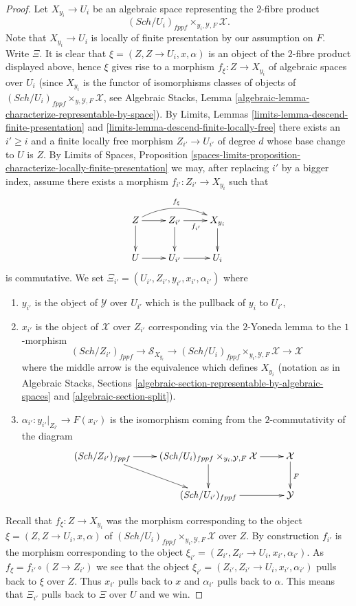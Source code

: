 \documentclass{stacks-project}
\theoremstyle{plain}
\theoremstyle{definition}
\theoremstyle{remark}
\numberwithin{equation}{subsection}
\def\Sch{\mathit{Sch}}
\begin{document}
\begin{proof}
\medskip\noindent
Let $X_{y_i} \to U_i$ be an algebraic space representing the $2$-fibre
product
$$
(\Sch/U_i)_{fppf} \times_{y_i, \mathcal{Y}, F} \mathcal{X}.
$$
Note that $X_{y_i} \to U_i$ is locally of finite presentation by our
assumption on $F$. Write $\Xi $. It is clear that
$\xi = (Z, Z \to U_i, x, \alpha)$ is an object of the $2$-fibre product
displayed above, hence $\xi$ gives rise to a morphism
$f_\xi : Z \to X_{y_i}$ of algebraic spaces over $U_i$
(since $X_{y_i}$ is the functor of isomorphisms classes of objects of
$(\Sch/U_i)_{fppf} \times_{y, \mathcal{Y}, F} \mathcal{X}$, see
Algebraic Stacks,
Lemma \ref{algebraic-lemma-characterize-representable-by-space}).
By
Limits, Lemmas \ref{limits-lemma-descend-finite-presentation} and
\ref{limits-lemma-descend-finite-locally-free}
there exists an $i' \geq i$ and a finite locally free morphism
$Z_{i'} \to U_{i'}$ of degree $d$ whose base change to $U$ is $Z$. By
Limits of Spaces, Proposition
\ref{spaces-limits-proposition-characterize-locally-finite-presentation}
we may, after replacing $i'$ by a bigger index, assume there exists a
morphism $f_{i'} : Z_{i'} \to X_{y_i}$ such that
$$
\xymatrix{
Z \ar[d] \ar[r] \ar@/^3ex/[rr]^{f_\xi} &
Z_{i'} \ar[d] \ar[r]_{f_{i'}} & X_{y_i} \ar[d] \\
U \ar[r] & U_{i'} \ar[r] & U_i
}
$$
is commutative. We set
$\Xi_{i'} = (U_{i'}, Z_{i'}, y_{i'}, x_{i'}, \alpha_{i'})$
where
\begin{enumerate}
\item $y_{i'}$ is the object of $\mathcal{Y}$ over $U_{i'}$
which is the pullback of $y_i$ to $U_{i'}$,
\item $x_{i'}$ is the object of $\mathcal{X}$ over $Z_{i'}$ corresponding
via the $2$-Yoneda lemma to the $1$-morphism
$$
(\Sch/Z_{i'})_{fppf} \to
\mathcal{S}_{X_{y_i}} \to
(\Sch/U_i)_{fppf} \times_{y_i, \mathcal{Y}, F} \mathcal{X} \to
\mathcal{X}
$$
where the middle arrow is the equivalence which defines $X_{y_i}$
(notation as in
Algebraic Stacks, Sections
\ref{algebraic-section-representable-by-algebraic-spaces} and
\ref{algebraic-section-split}).
\item $\alpha_{i'} : y_{i'}|_{Z_{i'}} \to F(x_{i'})$ is the isomorphism
coming from the $2$-commutativity of the diagram
$$
\xymatrix{
(\Sch/Z_{i'})_{fppf} \ar[r] \ar[rd] &
(\Sch/U_i)_{fppf} \times_{y_i, \mathcal{Y}, F} \mathcal{X}
\ar[r] \ar[d] &
\mathcal{X} \ar[d]^F \\
& (\Sch/U_{i'})_{fppf} \ar[r] & \mathcal{Y}
}
$$
\end{enumerate}
Recall that $f_\xi : Z \to X_{y_i}$ was the morphism corresponding to
the object $\xi = (Z, Z \to U_i, x, \alpha)$ of
$(\Sch/U_i)_{fppf} \times_{y_i, \mathcal{Y}, F} \mathcal{X}$
over $Z$. By construction $f_{i'}$ is the morphism corresponding to
the object $\xi_{i'} = (Z_{i'}, Z_{i'} \to U_i, x_{i'}, \alpha_{i'})$.
As $f_\xi = f_{i'} \circ (Z \to Z_{i'})$ we see that
the object $\xi_{i'} = (Z_{i'}, Z_{i'} \to U_i, x_{i'}, \alpha_{i'})$ pulls
back to $\xi$ over $Z$. Thus $x_{i'}$ pulls back to $x$ and $\alpha_{i'}$
pulls back to $\alpha$. This means that $\Xi_{i'}$ pulls back
to $\Xi$ over $U$ and we win.
\end{proof}
\end{document}
